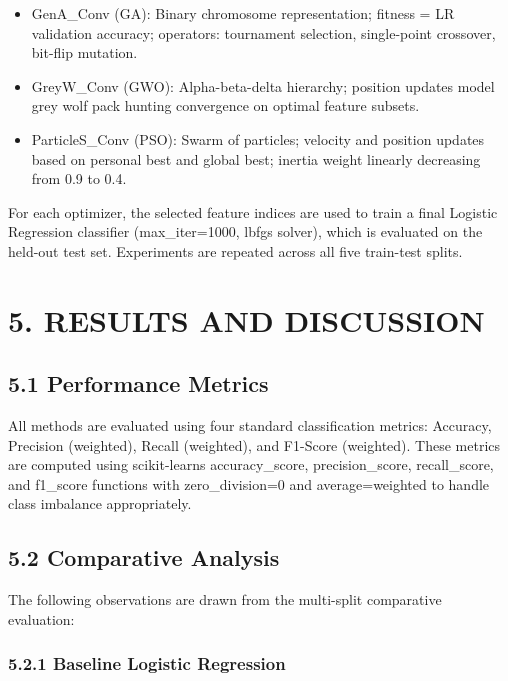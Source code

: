 \documentclass[
]{article}
\begin{document}
\begin{itemize}
\item
  GenA\_Conv (GA): Binary chromosome representation; fitness = LR
  validation accuracy; operators: tournament selection, single-point
  crossover, bit-flip mutation.
\item
  GreyW\_Conv (GWO): Alpha-beta-delta hierarchy; position updates model
  grey wolf pack hunting convergence on optimal feature subsets.
\item
  ParticleS\_Conv (PSO): Swarm of particles; velocity and position
  updates based on personal best and global best; inertia weight
  linearly decreasing from 0.9 to 0.4.
\end{itemize}

For each optimizer, the selected feature indices are used to train a
final Logistic Regression classifier (max\_iter=1000, lbfgs solver),
which is evaluated on the held-out test set. Experiments are repeated
across all five train-test splits.

\hypertarget{results-and-discussion}{%
\section{5. RESULTS AND DISCUSSION}\label{results-and-discussion}}

\hypertarget{performance-metrics}{%
\subsection{5.1 Performance Metrics}\label{performance-metrics}}

All methods are evaluated using four standard classification metrics:
Accuracy, Precision (weighted), Recall (weighted), and F1-Score
(weighted). These metrics are computed using
scikit-learn\textquotesingle s accuracy\_score, precision\_score,
recall\_score, and f1\_score functions with zero\_division=0 and
average=\textquotesingle weighted\textquotesingle{} to handle class
imbalance appropriately.

\hypertarget{comparative-analysis}{%
\subsection{5.2 Comparative Analysis}\label{comparative-analysis}}

The following observations are drawn from the multi-split comparative
evaluation:

\hypertarget{baseline-logistic-regression}{%
\subsubsection{5.2.1 Baseline Logistic
Regression}\label{baseline-logistic-regression}}
\end{document}
